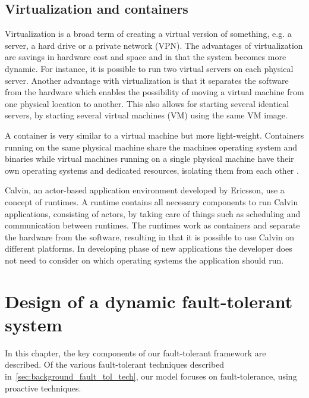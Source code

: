 \documentclass{cslthse-msc}
\begin{document}
\section{Virtualization and containers} \label{sec:background_virtualization}
Virtualization is a broad term of creating a virtual version of something, e.g. a server, a hard drive or a private network (VPN). The advantages of virtualization are savings in hardware cost and space and in that the system becomes more dynamic. For instance, it is possible to run two virtual servers on each physical server. Another advantage with virtualization is that it separates the software from the hardware which enables the possibility of moving a virtual machine from one physical location to another. This also allows for starting several identical servers, by starting several virtual machines (VM) using the same VM image.

A container is very similar to a virtual machine but more light-weight. Containers running on the same physical machine share the machines operating system and binaries while virtual machines running on a single physical machine have their own operating systems and dedicated resources, isolating them from each other \cite{vm_vs_container}.

Calvin, an actor-based application environment developed by Ericsson, use a concept of runtimes. A runtime contains all necessary components to run Calvin applications, consisting of actors, by taking care of things such as scheduling and communication between runtimes. The runtimes work as containers and separate the hardware from the software, resulting in that it is possible to use Calvin on different platforms. In developing phase of new applications the developer does not need to consider on which operating systems the application should run.

\chapter{Design of a dynamic fault-tolerant system} \label{ch:design}
In this chapter, the key components of our fault-tolerant framework are described. Of the various fault-tolerant techniques described in~\ref{sec:background_fault_tol_tech}, our model focuses on fault-tolerance, using proactive techniques.
\end{document}
